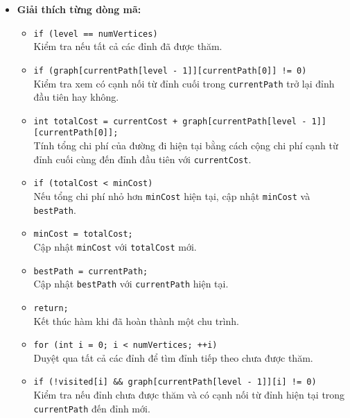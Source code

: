 \documentclass[a4paper]{article}
\begin{document}
\begin{itemize}
\begin{itemize}
\begin{itemize}
\begin{itemize}
\begin{itemize}
            \end{itemize}
        \end{itemize}
    \end{itemize}
\end{itemize}
\begin{itemize}
    \item \textbf{Giải thích từng dòng mã:}
    \begin{itemize}
        \item \texttt{if (level == numVertices)} \\ 
        Kiểm tra nếu tất cả các đỉnh đã được thăm.

        \item \texttt{if (graph[currentPath[level - 1]][currentPath[0]] != 0)} \\ 
        Kiểm tra xem có cạnh nối từ đỉnh cuối trong \texttt{currentPath} trở lại đỉnh đầu tiên hay không.

        \item \texttt{int totalCost = currentCost + graph[currentPath[level - 1]][currentPath[0]];} \\ 
        Tính tổng chi phí của đường đi hiện tại bằng cách cộng chi phí cạnh từ đỉnh cuối cùng đến đỉnh đầu tiên với \texttt{currentCost}.

        \item \texttt{if (totalCost < minCost)} \\ 
        Nếu tổng chi phí nhỏ hơn \texttt{minCost} hiện tại, cập nhật \texttt{minCost} và \texttt{bestPath}.

        \item \texttt{minCost = totalCost;} \\ 
        Cập nhật \texttt{minCost} với \texttt{totalCost} mới.

        \item \texttt{bestPath = currentPath;} \\ 
        Cập nhật \texttt{bestPath} với \texttt{currentPath} hiện tại.

        \item \texttt{return;} \\ 
        Kết thúc hàm khi đã hoàn thành một chu trình.

        \item \texttt{for (int i = 0; i < numVertices; ++i)} \\ 
        Duyệt qua tất cả các đỉnh để tìm đỉnh tiếp theo chưa được thăm.

        \item \texttt{if (!visited[i] && graph[currentPath[level - 1]][i] != 0)} \\
        Kiểm tra nếu đỉnh chưa được thăm và có cạnh nối từ đỉnh hiện tại trong \texttt{currentPath} đến đỉnh mới.


\end{itemize}
\end{itemize}
\end{itemize}
\end{document}
